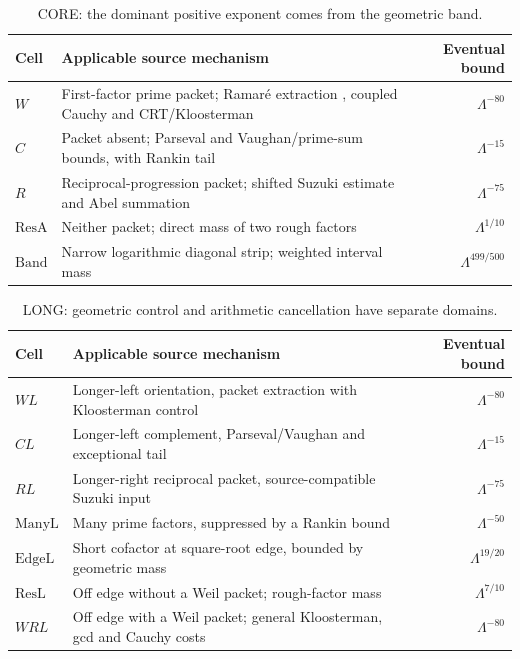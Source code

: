 \documentclass[11pt]{article}
\theoremstyle{definition}
\theoremstyle{remark}
\newcommand{\1}{\mathbf 1}
\begin{document}
\begin{table}[htbp]
\centering\small
\caption{CORE: the dominant positive exponent comes from the geometric band.}
\label{tab:core-cells}
\begin{tabular}{@{}lp{3.95in}r@{}}
\toprule
Cell & Applicable source mechanism & Eventual bound \\
\midrule
$W$ & First-factor prime packet; Ramar\'e extraction \cite{Ramare2010}, coupled Cauchy and CRT/Kloosterman & $\Lambda^{-80}$\\
$C$ & Packet absent; Parseval and Vaughan/prime-sum bounds, with Rankin tail & $\Lambda^{-15}$\\
$R$ & Reciprocal-progression packet; shifted Suzuki estimate and Abel summation & $\Lambda^{-75}$\\
$\mathrm{ResA}$ & Neither packet; direct mass of two rough factors & $\Lambda^{1/10}$\\
$\mathrm{Band}$ & Narrow logarithmic diagonal strip; weighted interval mass & $\Lambda^{499/500}$\\
\bottomrule
\end{tabular}
\end{table}

\begin{table}[htbp]
\centering\small
\caption{LONG: geometric control and arithmetic cancellation have separate domains.}
\label{tab:long-cells}
\begin{tabular}{@{}lp{3.95in}r@{}}
\toprule
Cell & Applicable source mechanism & Eventual bound \\
\midrule
$WL$ & Longer-left orientation, packet extraction with Kloosterman control & $\Lambda^{-80}$\\
$CL$ & Longer-left complement, Parseval/Vaughan and exceptional tail & $\Lambda^{-15}$\\
$RL$ & Longer-right reciprocal packet, source-compatible Suzuki input & $\Lambda^{-75}$\\
$\mathrm{ManyL}$ & Many prime factors, suppressed by a Rankin bound & $\Lambda^{-50}$\\
$\mathrm{EdgeL}$ & Short cofactor at square-root edge, bounded by geometric mass & $\Lambda^{19/20}$\\
$\mathrm{ResL}$ & Off edge without a Weil packet; rough-factor mass & $\Lambda^{7/10}$\\
$WRL$ & Off edge with a Weil packet; general Kloosterman, gcd and Cauchy costs & $\Lambda^{-80}$\\
\bottomrule
\end{tabular}
\end{table}
\end{document}
